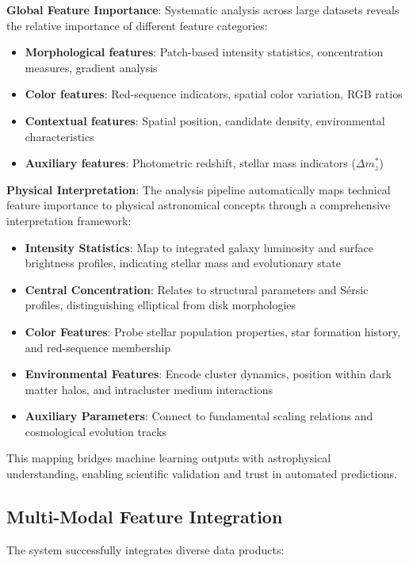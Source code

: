 \documentclass[twocolumn,10pt]{aastex631}
\begin{document}
\textbf{Global Feature Importance}: Systematic analysis across large datasets reveals the relative importance of different feature categories:
\begin{itemize}
\item \textbf{Morphological features}: Patch-based intensity statistics, concentration measures, gradient analysis
\item \textbf{Color features}: Red-sequence indicators, spatial color variation, RGB ratios
\item \textbf{Contextual features}: Spatial position, candidate density, environmental characteristics  
\item \textbf{Auxiliary features}: Photometric redshift, stellar mass indicators ($\Delta m^*_z$)
\end{itemize}

\textbf{Physical Interpretation}: The analysis pipeline automatically maps technical feature importance to physical astronomical concepts through a comprehensive interpretation framework:

\begin{itemize}
\item \textbf{Intensity Statistics}: Map to integrated galaxy luminosity and surface brightness profiles, indicating stellar mass and evolutionary state
\item \textbf{Central Concentration}: Relates to structural parameters and Sérsic profiles, distinguishing elliptical from disk morphologies
\item \textbf{Color Features}: Probe stellar population properties, star formation history, and red-sequence membership
\item \textbf{Environmental Features}: Encode cluster dynamics, position within dark matter halos, and intracluster medium interactions
\item \textbf{Auxiliary Parameters}: Connect to fundamental scaling relations and cosmological evolution tracks
\end{itemize}

This mapping bridges machine learning outputs with astrophysical understanding, enabling scientific validation and trust in automated predictions.

\subsection{Multi-Modal Feature Integration}

The system successfully integrates diverse data products:
\end{document}
